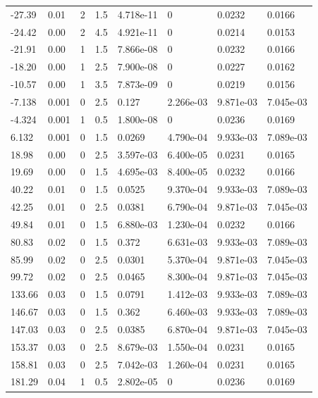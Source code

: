 \documentclass[preview]{standalone}
\begin{document}
{{\begin{tabular}{L{1.2cm}C{1.2cm} C{0.3cm}C{0.5cm} C{1.4cm}C{1.4cm} C{1.4cm}C{1.4cm}}
  -27.39  &  0.01  & 2     & 1.5 &  4.718e-11  & 0  & 0.0232 &  0.0166   \\ 
  -24.42  &  0.00  & 2     & 4.5 &  4.921e-11  & 0  & 0.0214 &  0.0153   \\ 
  -21.91  &  0.00  & 1     & 1.5 &  7.866e-08  & 0  & 0.0232 &  0.0166   \\ 
  -18.20  &  0.00  & 1     & 2.5 &  7.900e-08  & 0  & 0.0227 &  0.0162   \\ 
  -10.57  &  0.00  & 1     & 3.5 &  7.873e-09  & 0  & 0.0219 &  0.0156   \\ 
  -7.138  &  0.001  & 0     & 2.5 &  0.127  & 2.266e-03  & 9.871e-03 &  7.045e-03   \\ 
  -4.324  &  0.001  & 1     & 0.5 &  1.800e-08  & 0  & 0.0236 &  0.0169   \\ 
  6.132  &  0.001  & 0     & 1.5 &  0.0269  & 4.790e-04  & 9.933e-03 &  7.089e-03   \\ 
  18.98  &  0.00  & 0     & 2.5 &  3.597e-03  & 6.400e-05  & 0.0231 &  0.0165   \\ 
  19.69  &  0.00  & 0     & 1.5 &  4.695e-03  & 8.400e-05  & 0.0232 &  0.0166   \\ 
  40.22  &  0.01  & 0     & 1.5 &  0.0525  & 9.370e-04  & 9.933e-03 &  7.089e-03   \\ 
  42.25  &  0.01  & 0     & 2.5 &  0.0381  & 6.790e-04  & 9.871e-03 &  7.045e-03   \\ 
  49.84  &  0.01  & 0     & 1.5 &  6.880e-03  & 1.230e-04  & 0.0232 &  0.0166   \\ 
  80.83  &  0.02  & 0     & 1.5 &  0.372  & 6.631e-03  & 9.933e-03 &  7.089e-03   \\ 
  85.99  &  0.02  & 0     & 2.5 &  0.0301  & 5.370e-04  & 9.871e-03 &  7.045e-03   \\ 
  99.72  &  0.02  & 0     & 2.5 &  0.0465  & 8.300e-04  & 9.871e-03 &  7.045e-03   \\ 
  133.66  &  0.03  & 0     & 1.5 &  0.0791  & 1.412e-03  & 9.933e-03 &  7.089e-03   \\ 
  146.67  &  0.03  & 0     & 1.5 &  0.362  & 6.460e-03  & 9.933e-03 &  7.089e-03   \\ 
  147.03  &  0.03  & 0     & 2.5 &  0.0385  & 6.870e-04  & 9.871e-03 &  7.045e-03   \\ 
  153.37  &  0.03  & 0     & 2.5 &  8.679e-03  & 1.550e-04  & 0.0231 &  0.0165   \\ 
  158.81  &  0.03  & 0     & 2.5 &  7.042e-03  & 1.260e-04  & 0.0231 &  0.0165   \\ 
  181.29  &  0.04  & 1     & 0.5 &  2.802e-05  & 0  & 0.0236 &  0.0169   \\ 

\end{tabular}}}
\end{document}
